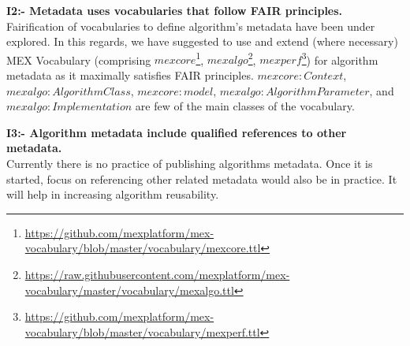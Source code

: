 \documentclass[preprint,12pt]{elsarticle}
\begin{document}
\textbf{I2:- Metadata uses vocabularies that follow FAIR principles.}\\
Fairification of vocabularies to define algorithm's metadata have been under explored. In this regards, we have suggested to use and extend (where necessary) MEX Vocabulary (comprising $mexcore$\footnote{\label{core}\url{https://github.com/mexplatform/mex-vocabulary/blob/master/vocabulary/mexcore.ttl}}, $mexalgo$\footnote{\label{algo}\url{https://raw.githubusercontent.com/mexplatform/mex-vocabulary/master/vocabulary/mexalgo.ttl}}, $mexperf$\footnote{\label{perf}\url{https://github.com/mexplatform/mex-vocabulary/blob/master/vocabulary/mexperf.ttl}}) \cite{esteves2015mex} for algorithm metadata as it maximally satisfies FAIR principles. $mexcore:Context$, $mexalgo:AlgorithmClass$, $mexcore:model$, $mexalgo:AlgorithmParameter$, and $mexalgo:Implementation$ are few of the main classes of the vocabulary.

\textbf{I3:- Algorithm metadata include qualified references to other metadata.}\\
Currently there is no practice of publishing algorithms metadata. Once it is started, focus on referencing other related metadata would also be in practice. It will help in increasing algorithm reusability.


\end{document}
